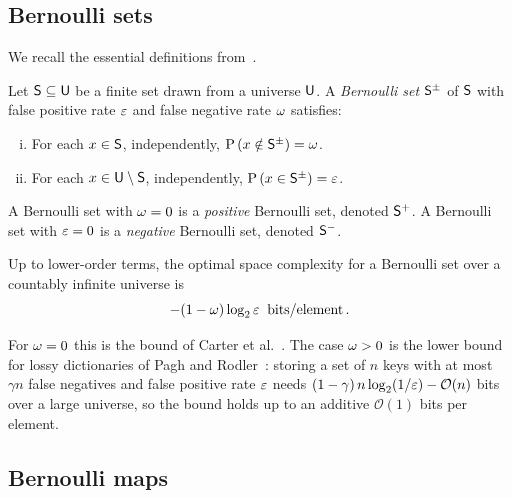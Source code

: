 \subsection{Bernoulli sets}
\label{sec:prelim_bset}

We recall the essential definitions from~\cite{bernoulli_sets}.

\begin{definition}
\label{def:bernoulli_set}
Let $\Set{S} \subseteq \Set{U}$ be a finite set drawn from a universe
$\Set{U}$.
A \emph{Bernoulli set} $\ASet{S}$ of $\Set{S}$ with false positive rate
$\fprate$ and false negative rate $\fnrate$ satisfies:
\begin{enumerate}[(i)]
    \item For each $x \in \Set{S}$, independently,
    $\Prob{x \notin \ASet{S}} = \fnrate$.
    \item For each $x \in \Set{U} \setminus \Set{S}$, independently,
    $\Prob{x \in \ASet{S}} = \fprate$.
\end{enumerate}
A Bernoulli set with $\fnrate = 0$ is a \emph{positive} Bernoulli set,
denoted $\PASet{S}$.
A Bernoulli set with $\fprate = 0$ is a \emph{negative} Bernoulli set,
denoted $\NASet{S}$.
\end{definition}

\begin{theorem}
\label{post:set_lb}
Up to lower-order terms, the optimal space complexity for a Bernoulli set over
a countably infinite universe is
\begin{equation}
    -(1 - \fnrate) \log_2 \fprate \;\; \si{bits \per element}\,.
\end{equation}
\end{theorem}

For $\fnrate = 0$ this is the bound of Carter et al.~\cite{carter1978}.
The case $\fnrate > 0$ is the lower bound for lossy dictionaries of Pagh and
Rodler~\cite[Prop.~1]{pagh2001lossy}: storing a set of $n$ keys with at most
$\gamma n$ false negatives and false positive rate $\fprate$ needs
$(1-\gamma)\, n \log_2(1/\fprate) - \mathcal{O}(n)$ bits over a large universe,
so the bound holds up to an additive $\mathcal{O}(1)$ bits per element.

\subsection{Bernoulli maps}
\label{sec:prelim_bmap}

